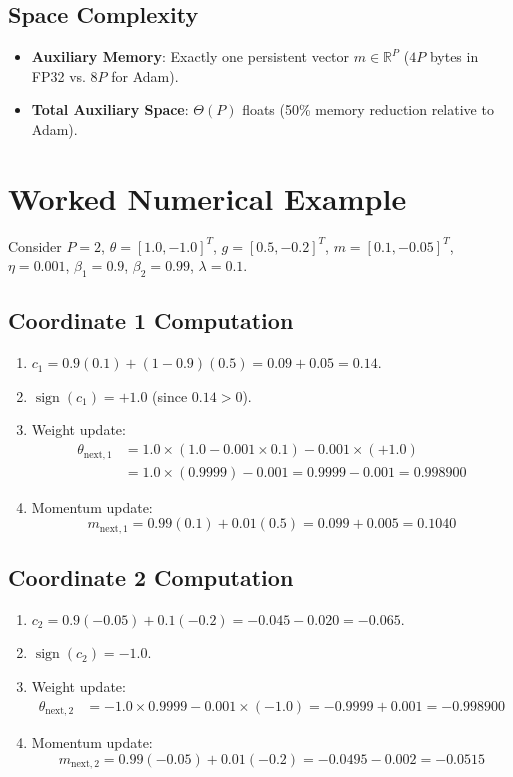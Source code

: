 \documentclass[11pt,a4paper]{article}
\theoremstyle{definition}
\begin{document}
\subsection{Space Complexity}
\begin{itemize}
    \item \textbf{Auxiliary Memory}: Exactly one persistent vector $m \in \mathbb{R}^P$ ($4P$ bytes in FP32 vs. $8P$ for Adam).
    \item \textbf{Total Auxiliary Space}: $\Theta(P)$ floats (50\% memory reduction relative to Adam).
\end{itemize}

\section{Worked Numerical Example}

Consider $P=2$, $\theta = [1.0, -1.0]^T$, $g = [0.5, -0.2]^T$, $m = [0.1, -0.05]^T$, $\eta = 0.001$, $\beta_1 = 0.9$, $\beta_2 = 0.99$, $\lambda = 0.1$.

\subsection{Coordinate 1 Computation}
\begin{enumerate}
    \item $c_1 = 0.9(0.1) + (1 - 0.9)(0.5) = 0.09 + 0.05 = 0.14$.
    \item $\operatorname{sign}(c_1) = +1.0$ (since $0.14 > 0$).
    \item Weight update:
    \begin{align}
    \theta_{\text{next}, 1} &= 1.0 \times (1.0 - 0.001 \times 0.1) - 0.001 \times (+1.0) \\
    &= 1.0 \times (0.9999) - 0.001 = 0.9999 - 0.001 = 0.998900
    \end{align}
    \item Momentum update:
    \begin{equation}
    m_{\text{next}, 1} = 0.99(0.1) + 0.01(0.5) = 0.099 + 0.005 = 0.1040
    \end{equation}
\end{enumerate}

\subsection{Coordinate 2 Computation}
\begin{enumerate}
    \item $c_2 = 0.9(-0.05) + 0.1(-0.2) = -0.045 - 0.020 = -0.065$.
    \item $\operatorname{sign}(c_2) = -1.0$.
    \item Weight update:
    \begin{align}
    \theta_{\text{next}, 2} &= -1.0 \times 0.9999 - 0.001 \times (-1.0) = -0.9999 + 0.001 = -0.998900
    \end{align}
    \item Momentum update:
    \begin{equation}
    m_{\text{next}, 2} = 0.99(-0.05) + 0.01(-0.2) = -0.0495 - 0.002 = -0.0515
    \end{equation}
\end{enumerate}
\end{document}
